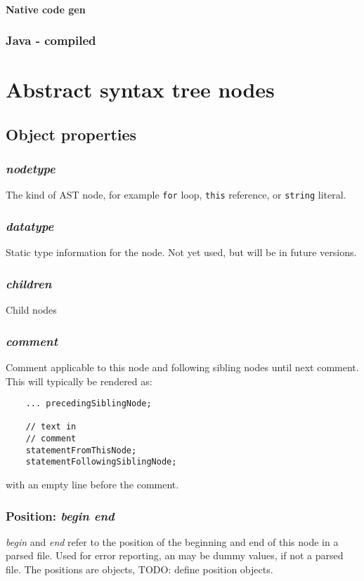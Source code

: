 \documentclass[10pt]{article}
\newcommand{\n}[1]{{\tt #1}}
\newcommand{\p}[1]{{\em #1}}
\begin{document}
\paragraph{Native code gen}
\subsubsection{Java - compiled}
\section{Abstract syntax tree nodes}
\subsection{Object properties}
\subsubsection{\em nodetype}
The kind of AST node, for example \n{for} loop, \n{this} reference, or \n{string} literal. 
\subsubsection{\em datatype}
Static type information for the node. Not yet used, but will be in future versions.
\subsubsection{\em children}
Child nodes 
\subsubsection{\em comment}
Comment applicable to this node and following sibling nodes until next comment. This will typically be rendered as:
\begin{verbatim}
    ... precedingSiblingNode;

    // text in
    // comment
    statementFromThisNode;
    statementFollowingSiblingNode;
\end{verbatim}
with an empty line before the comment.

\subsubsection{Position: \em begin end}
\p{begin} and \p{end} refer to the position of the beginning and end of this node in a parsed file. Used for error reporting, an may be dummy values, if not a parsed file.
The positions are objects, TODO: define position objects.
\end{document}
